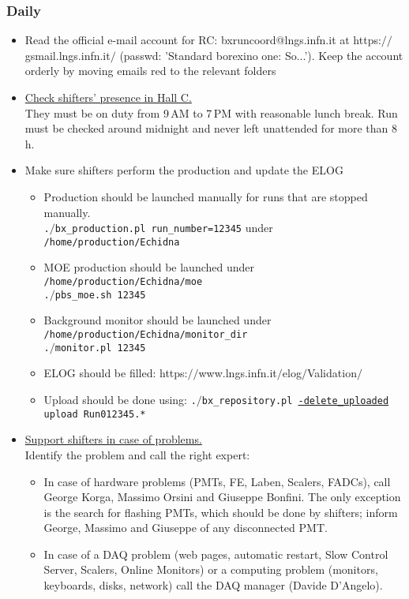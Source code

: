 \documentclass[a4paper,10pt]{article}
\begin{document}
 \subsubsection{Daily}
\begin{itemize}
 \item Read the official e-mail account for RC: bxruncoord@lngs.infn.it at https:$//$gsmail.lngs.infn.it$/$ (passwd:  'Standard borexino one: So...'). Keep the account orderly by moving emails red to the relevant folders
\item \underline{Check shifters' presence in Hall C.}\\ They must be on duty from 9\,AM to 7\,PM with reasonable lunch break. Run must be checked around midnight and never left unattended for more than 8\,h.
 \item Make sure shifters perform the production and update the ELOG \\
 \begin{itemize}
 \item Production should be launched manually for runs that are stopped manually.  \\
  \texttt{.$/$bx\_production.pl run\_number=12345} under \texttt{/home/production/Echidna}
 \item MOE production should be launched under \texttt{ /home/production/Echidna/moe} \\
  \texttt{.$/$pbs\_moe.sh 12345}
 \item Background monitor should be launched under \texttt{ /home/production/Echidna/monitor\_dir} \\
  \texttt{.$/$monitor.pl 12345}
 
 \item ELOG should be filled: https:$//$www.lngs.infn.it$/$elog$/$Validation$/$
 \item Upload should be done using:  \texttt{.$/$bx\_repository.pl \underline{-delete\_uploaded} upload Run012345.*}
 \end{itemize}

\item \underline{Support shifters in case of problems.} \\ Identify the problem and call the right expert:
\begin{itemize}
\item In case of hardware problems (PMTs, FE, Laben, Scalers, FADCs), call George Korga, Massimo Orsini and Giuseppe Bonfini. The only exception is the search for 
flashing PMTs, which should be done by shifters; inform George, Massimo and Giuseppe of any disconnected PMT. 
\item In case of a DAQ problem (web pages, automatic restart, Slow Control Server, Scalers, Online Monitors) 
or a computing problem (monitors, keyboards, disks, network) call the DAQ manager (Davide D'Angelo). 
\end{itemize}


\end{itemize}
\end{document}
